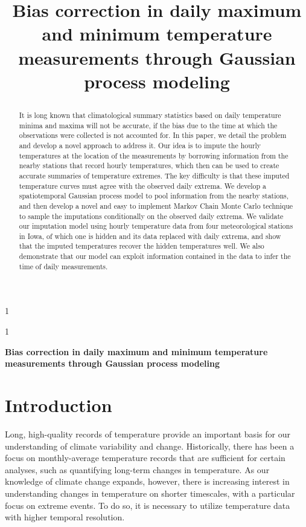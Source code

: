 \documentclass[12pt]{article}
\newcommand{\blind}{1}
\newcommand{\temptitle}{
	Bias correction in daily maximum and minimum temperature measurements through Gaussian process modeling
}
\begin{document}
\blind
{
\title{
    \Large
    \bf
    \temptitle
}
\author{\tempauthors}
\maketitle
} \fi

\blind
{
  \bigskip
  \bigskip
  \bigskip
  \begin{center}
    {\LARGE\bf \temptitle}
\end{center}
  \medskip
} \fi
    
\begin{abstract}
It is long known that climatological summary statistics based on daily temperature minima and maxima will not be accurate, if the bias due to the time at which the observations were collected is not accounted for.
In this paper, we detail the problem and develop a novel approach to address it.
Our idea is to impute the hourly temperatures at the location of the measurements by borrowing information from the nearby stations that record hourly temperatures, which then can be used to create accurate summaries of temperature extremes.
The key difficulty is that these imputed temperature curves must agree with the observed daily extrema.
We develop a spatiotemporal Gaussian process model to pool information from the nearby stations, and then develop a novel and easy to implement Markov Chain Monte Carlo technique to sample the imputations conditionally on the observed daily extrema. 
We validate our imputation model using hourly temperature data from four meteorological stations in Iowa,
of which one is hidden and its data replaced with daily extrema,
and show that the imputed temperatures recover the hidden temperatures well.
We also demonstrate that our model can exploit information contained in the data to infer the time of daily measurements. 
\end{abstract}

\section{Introduction}\label{sec:introduction}

Long, high-quality records of temperature provide an important basis for our understanding of climate variability and change. Historically, there has been a focus on monthly-average temperature records that are sufficient for certain analyses, such as quantifying long-term changes in temperature. As our knowledge of climate change expands, however, there is increasing interest in understanding changes in temperature on shorter timescales, with a particular focus on extreme events. To do so, it is necessary to utilize temperature data with higher temporal resolution. 
\end{document}

